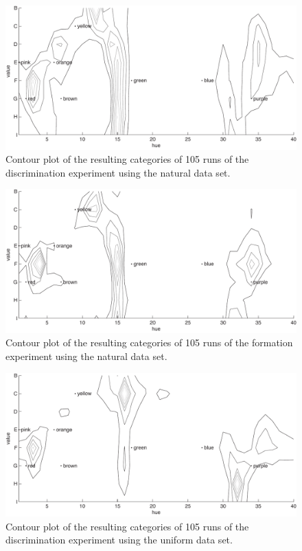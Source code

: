\begin{figure}[p]
\centering
  \includegraphics[width=.85\textwidth]{./experiments/figures/contour-natural-no-language}
  \caption{Contour plot of the resulting categories of 105 runs of the
    discrimination experiment using the natural data set.}
\label{f:contour-natural-no-language}
\end{figure}

\begin{figure}[p]
\centering
  \includegraphics[width=.85\textwidth]{./experiments/figures/contour-natural-language}
  \caption{Contour plot of the resulting categories of 105 runs of the
    formation experiment using the natural data set.}
\label{f:contour-natural-language}
\end{figure}

\begin{figure}[p]
\centering
  \includegraphics[width=.85\textwidth]{./experiments/figures/contour-uniform-no-language}
  \caption{Contour plot of the resulting categories of 105 runs of the
    discrimination experiment using the uniform data set.}
\label{f:contour-uniform-no-language}
\end{figure}


